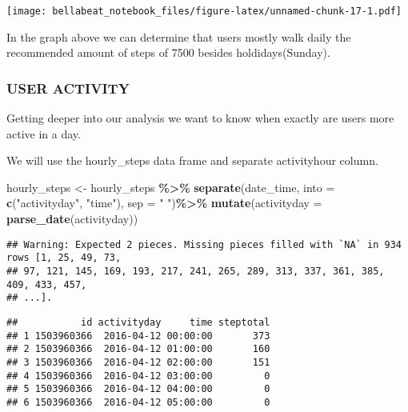 \documentclass[
]{article}
\newenvironment{Shaded}{\begin{snugshade}}{\end{snugshade}}
\newcommand{\AttributeTok}[1]{\textcolor[rgb]{0.13,0.29,0.53}{#1}}
\newcommand{\FunctionTok}[1]{\textcolor[rgb]{0.13,0.29,0.53}{\textbf{#1}}}
\newcommand{\NormalTok}[1]{#1}
\newcommand{\OtherTok}[1]{\textcolor[rgb]{0.56,0.35,0.01}{#1}}
\newcommand{\SpecialCharTok}[1]{\textcolor[rgb]{0.81,0.36,0.00}{\textbf{#1}}}
\newcommand{\StringTok}[1]{\textcolor[rgb]{0.31,0.60,0.02}{#1}}
\begin{document}
\texttt{[image: bellabeat\_notebook\_files/figure-latex/unnamed-chunk-17-1.pdf]}

In the graph above we can determine that users mostly walk daily the
recommended amount of steps of 7500 besides holdidays(Sunday).

\hypertarget{user-activity}{%
\subsubsection{USER ACTIVITY}\label{user-activity}}

Getting deeper into our analysis we want to know when exactly are users
more active in a day.

We will use the hourly\_steps data frame and separate activityhour
column.

\begin{Shaded}
\begin{Highlighting}[]
\NormalTok{hourly\_steps }\OtherTok{\textless{}{-}}\NormalTok{ hourly\_steps }\SpecialCharTok{\%\textgreater{}\%}
  \FunctionTok{separate}\NormalTok{(date\_time, }\AttributeTok{into =} \FunctionTok{c}\NormalTok{(}\StringTok{"activityday"}\NormalTok{, }\StringTok{"time"}\NormalTok{), }\AttributeTok{sep =} \StringTok{" "}\NormalTok{)}\SpecialCharTok{\%\textgreater{}\%}
  \FunctionTok{mutate}\NormalTok{(}\AttributeTok{activityday =} \FunctionTok{parse\_date}\NormalTok{(activityday))}
\end{Highlighting}
\end{Shaded}

\begin{verbatim}
## Warning: Expected 2 pieces. Missing pieces filled with `NA` in 934 rows [1, 25, 49, 73,
## 97, 121, 145, 169, 193, 217, 241, 265, 289, 313, 337, 361, 385, 409, 433, 457,
## ...].
\end{verbatim}

\begin{Shaded}
\end{Shaded}

\begin{verbatim}
##           id activityday     time steptotal
## 1 1503960366  2016-04-12 00:00:00       373
## 2 1503960366  2016-04-12 01:00:00       160
## 3 1503960366  2016-04-12 02:00:00       151
## 4 1503960366  2016-04-12 03:00:00         0
## 5 1503960366  2016-04-12 04:00:00         0
## 6 1503960366  2016-04-12 05:00:00         0
\end{verbatim}
\end{document}

